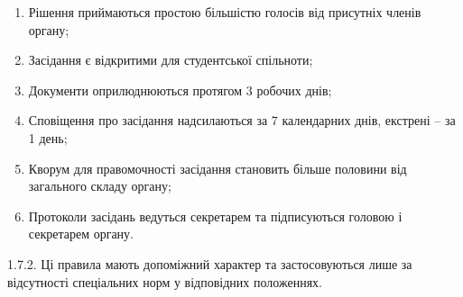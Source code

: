         \begin{enumerate}[label=\alph*)]
            \item Рішення приймаються простою більшістю голосів від присутніх членів органу;
            \item Засідання є відкритими для студентської спільноти;
            \item Документи оприлюднюються протягом 3 робочих днів;
            \item Сповіщення про засідання надсилаються за 7 календарних днів, екстрені -- за 1 день;
            \item Кворум для правомочності засідання становить більше половини від загального складу органу;
            \item Протоколи засідань ведуться секретарем та підписуються головою і секретарем органу.
        \end{enumerate}

    1.7.2. Ці правила мають допоміжний характер та застосовуються лише за відсутності спеціальних норм у відповідних положеннях.
